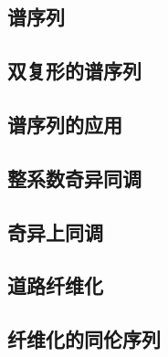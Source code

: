 \subsection{谱序列}

\subsection{双复形的谱序列}

\subsection{谱序列的应用}

\subsection{整系数奇异同调}

\subsection{奇异上同调}

\subsection{道路纤维化}

\subsection{纤维化的同伦序列}


